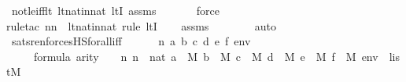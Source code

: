 \begin{isabellebody}
\ not{\isacharunderscore}{\kern0pt}le{\isacharunderscore}{\kern0pt}iff{\isacharunderscore}{\kern0pt}lt\ lt{\isacharunderscore}{\kern0pt}nat{\isacharunderscore}{\kern0pt}in{\isacharunderscore}{\kern0pt}nat\ ltI\ assms\isanewline
\ \ \ \ \ \isamarkupfalse%
\ force\ \isanewline
\ \ \ \ \isamarkupfalse%
{\isacharparenleft}{\kern0pt}rule{\isacharunderscore}{\kern0pt}tac\ n{\isacharequal}{\kern0pt}n\ \ lt{\isacharunderscore}{\kern0pt}nat{\isacharunderscore}{\kern0pt}in{\isacharunderscore}{\kern0pt}nat{\isacharcomma}{\kern0pt}\ rule\ ltI{\isacharparenright}{\kern0pt}\isanewline
\ \ \isamarkupfalse%
\ assms\isanewline
\ \ \ \ \ \ \isamarkupfalse%
\ auto{\isacharbrackleft}{\kern0pt}{}{\isacharbrackright}{\kern0pt}\isanewline
\ \ \isamarkupfalse%
%
\endisatagproof
{\isafoldproof}%
%
\isadelimproof
\isanewline
%
\endisadelimproof
\isanewline
{}\isamarkupfalse%
\ sats{\isacharunderscore}{\kern0pt}ren{\isacharunderscore}{\kern0pt}forcesHS{\isacharunderscore}{\kern0pt}forall{\isacharunderscore}{\kern0pt}iff\ {\isacharcolon}{\kern0pt}\ \isanewline
\ \ \ {\isasymphi}\ n\ a\ b\ c\ d\ e\ f\ env\isanewline
\ \ \ {\isachardoublequoteopen}{\isasymphi}\ {\isasymin}\ formula{\isachardoublequoteclose}\ {\isachardoublequoteopen}arity{\isacharparenleft}{\kern0pt}{\isasymphi}{\isacharparenright}{\kern0pt}\ {\isasymle}\ {}\ {\isasymunion}\ n{\isachardoublequoteclose}\ {\isachardoublequoteopen}n\ {\isasymin}\ nat{\isachardoublequoteclose}\ {\isachardoublequoteopen}a\ {\isasymin}\ M{\isachardoublequoteclose}\ {\isachardoublequoteopen}b\ {\isasymin}\ M{\isachardoublequoteclose}\ {\isachardoublequoteopen}c\ {\isasymin}\ M{\isachardoublequoteclose}\ {\isachardoublequoteopen}d\ {\isasymin}\ M{\isachardoublequoteclose}\ {\isachardoublequoteopen}e\ {\isasymin}\ M{\isachardoublequoteclose}\ {\isachardoublequoteopen}f\ {\isasymin}\ M{\isachardoublequoteclose}\ {\isachardoublequoteopen}env\ {\isasymin}\ list{\isacharparenleft}{\kern0pt}M{\isacharparenright}{\kern0pt}{\isachardoublequoteclose}\isanewline

\end{isabellebody}
